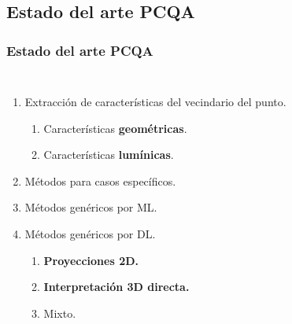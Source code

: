 \subsection{Estado del arte PCQA}
\begin{frame}
  \frametitle{Estado del arte PCQA}
  \begin{columns}
    \begin{enumerate}
      \item Extracción de características del vecindario del punto.
        \begin{enumerate}
          \item Características \textbf{geométricas}.
          \item Características \textbf{lumínicas}.
        \end{enumerate}
      \item Métodos para casos específicos. 
      \item Métodos genéricos por ML. 
      \item Métodos genéricos por DL.
        \begin{enumerate}
          \item \textbf{Proyecciones 2D.}
          \item \textbf{Interpretación 3D directa.}
          \item Mixto.
        \end{enumerate}
    \end{enumerate}


\end{columns}
\end{frame}
